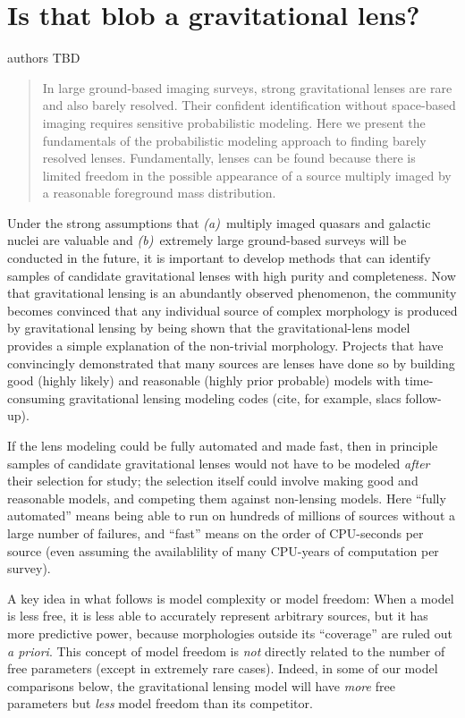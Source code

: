 \documentclass[12pt]{article}
\newcommand{\foreign}[1]{\emph{#1}}
\begin{document}
\sloppy\sloppypar
\section*{Is that blob a gravitational lens?}
\noindent
authors TBD

\begin{abstract}
In large ground-based imaging surveys, strong gravitational lenses are
rare and also barely resolved.  Their confident identification without
space-based imaging requires sensitive probabilistic modeling.  Here
we present the fundamentals of the probabilistic modeling approach to
finding barely resolved lenses.  Fundamentally, lenses can be found
because there is limited freedom in the possible appearance of a
source multiply imaged by a reasonable foreground mass distribution.
\end{abstract}

Under the strong assumptions that \textsl{(a)}~multiply imaged quasars
and galactic nuclei are valuable and \textsl{(b)}~extremely large
ground-based surveys will be conducted in the future, it is important
to develop methods that can identify samples of candidate
gravitational lenses with high purity and completeness.  Now that
gravitational lensing is an abundantly observed phenomenon, the
community becomes convinced that any individual source of complex
morphology is produced by gravitational lensing by being shown that
the gravitational-lens model provides a simple explanation of the
non-trivial morphology.  Projects that have convincingly demonstrated
that many sources are lenses have done so by building good (highly
likely) and reasonable (highly prior probable) models with
time-consuming gravitational lensing modeling codes (cite, for
example, slacs follow-up).

If the lens modeling could be fully automated and made fast, then in
principle samples of candidate gravitational lenses would not have to
be modeled \emph{after} their selection for study; the selection
itself could involve making good and reasonable models, and competing
them against non-lensing models.  Here ``fully automated'' means being
able to run on hundreds of millions of sources without a large number
of failures, and ``fast'' means on the order of CPU-seconds per source
(even assuming the availablility of many CPU-years of computation per
survey).

A key idea in what follows is model complexity or model freedom: When
a model is less free, it is less able to accurately represent
arbitrary sources, but it has more predictive power, because
morphologies outside its ``coverage'' are ruled out \foreign{a
  priori}.  This concept of model freedom is \emph{not} directly
related to the number of free parameters (except in extremely rare
cases).  Indeed, in some of our model comparisons below, the
gravitational lensing model will have \emph{more} free parameters but
\emph{less} model freedom than its competitor.
\end{document}
